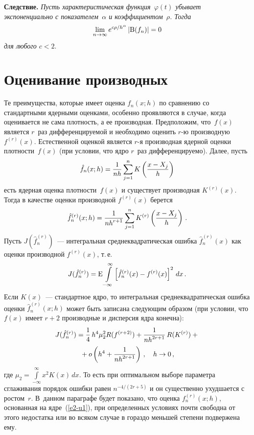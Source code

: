 \begin{multicols}{2}
\medskip

\noindent
\textbf{Следствие.} \textit{Пусть характеристическая функция~$\varphi(t)$ 
убывает экспоненциально с показателем~$\alpha$ и коэффициентом~$\rho$.
Тогда}
$$
\lim\limits_{n\to\infty}e^{c\rho/h^\alpha}\left\vert{\rm B}(f_n)\right\vert=0
$$
\textit{для любого $c<2$}.

\section {Оценивание производных}

Те преимущества, которые имеет оценка $f_n(x;h)$ по сравнению со стандартными
ядерными оценками, особенно проявляются в случае, когда оценивается не
сама плотность, а ее производная. Предположим, что~$f(x)$ является 
$r$~раз дифференцируемой и необходимо оценить
$r$-ю производную $f^{(r)}(x)$. Естественной оценкой является
$r$-я производная ядерной оценки плотности~$f(x)$
(при условии, что ядро $r$~раз дифференцируемо). Далее, пусть
$$
\hat f_n(x;h)=\displaystyle\frac{\displaystyle 1\mathstrut}{\displaystyle nh\mathstrut}\sum\limits_{j=1}^nK\left(\displaystyle\frac{\displaystyle x-X_j\mathstrut}{\displaystyle h\mathstrut}\right)
$$
есть ядерная оценка плотности~$f(x)$ и существует производная
$K^{(r)}(x)$. Тогда в качестве оценки производной $f^{(r)}(x)$ берется
$$
\hat f_n^{(r)}(x;h)= \displaystyle\frac{\displaystyle 1\mathstrut}{\displaystyle nh^{r+1}\mathstrut}\sum\limits_{j=1}^nK^{(r)}\left(
\displaystyle\frac{\displaystyle x-X_j\mathstrut}{\displaystyle h\mathstrut}\right)\,.
$$
Пусть $J(\hat f_n^{(r)})$~--- интегральная среднеквадратическая ошибка
$\hat f_n^{(r)}(x)$ как оценки производной $f^{(r)}(x)$, т.\,е.\
$$
J(\hat f_n^{(r)})={\rm E}\int\limits_{-\infty}^\infty
\left[\hat f_n^{(r)}(x)-f^{(r)}(x)\right]^2\,dx\,.
$$
Если $K(x)$~--- стандартное ядро, то интегральная среднеквадратическая
ошибка оценки $\hat f_n^{(r)}(x;h)$
может быть записана следующим образом (при условии, что $f(x)$ имеет
$r+2$ производные и дисперсия ядра конечна):
\begin{multline*}
J(\hat f_n^{(r)})=\displaystyle\frac{\displaystyle 1\mathstrut}{\displaystyle 4\mathstrut}\,h^4\mu_2^2R(f^{(r+2)})+
\displaystyle\frac{\displaystyle 1\mathstrut}{\displaystyle nh^{2r+1}\mathstrut}\,R(K^{(r)})+{}\\
{}+
o\left(h^4+\displaystyle\frac{\displaystyle 1\mathstrut}{\displaystyle nh^{2r+1}\mathstrut}\right)\,,\quad h\to0\,,
\end{multline*}
где $\mu_2=\int\limits_{-\infty}^\infty x^2K(x)\,dx$.
То есть при оптимальном выборе параметра сглаживания порядок ошибки
равен $n^{-4/(2r+5)}$ и он существенно ухудшается с ростом~$r$.
В~данном параграфе будет показано, что оценка $f_n^{(r)}(x;h)$, основанная
на ядре~(\ref{e2-u1}), при определенных условиях почти свободна от этого недостатка
или во всяком случае в гораздо меньшей степени подвержена ему.

\medskip


\end{multicols}
